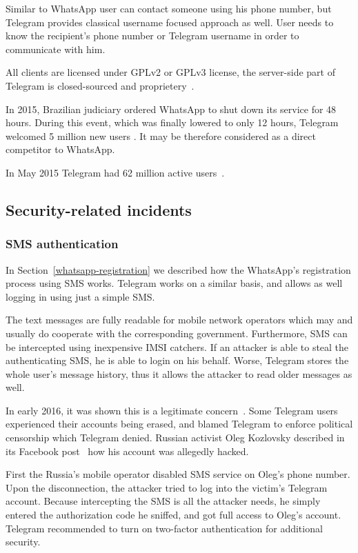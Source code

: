 \documentclass[thesis=M,english]{FITthesis}[2012/10/20]
\begin{document}
Similar to WhatsApp user can contact someone using his phone number, but Telegram provides classical username focused approach as well. User needs to know the recipient's phone number or Telegram username in order to communicate with him.

All clients are licensed under GPLv2 or GPLv3 license, the server-side part of Telegram is closed-sourced and proprietery~\cite{telegram-server}.

In 2015, Brazilian judiciary ordered WhatsApp to shut down its service for 48 hours. During this event, which was finally lowered to only 12 hours, Telegram welcomed 5 million new users \cite{whatsappbrazil}. It may be therefore considered as a direct competitor to WhatsApp.

In May 2015 Telegram had 62 million active users~\cite{telegram-users}.


\subsection{Security-related incidents}

\subsubsection{SMS authentication}

In Section~\ref{whatsapp-registration} we described how the WhatsApp's registration process using SMS works. Telegram works on a similar basis, and allows as well logging in using just a simple SMS.

The text messages are fully readable for mobile network operators which may and usually do cooperate with the corresponding government. Furthermore, SMS can be intercepted using inexpensive IMSI catchers. If an attacker is able to steal the authenticating SMS, he is able to login on his behalf. Worse, Telegram stores the whole user's message history, thus it allows the attacker to read older messages as well.

In early 2016, it was shown this is a legitimate concern~\cite{telegram-smsiran}. Some Telegram users experienced their accounts being erased, and blamed Telegram to enforce political censorship which Telegram denied. Russian activist Oleg Kozlovsky described in its Facebook post~\cite{telegram-russia} how his account was allegedly hacked.

First the Russia's mobile operator disabled SMS service on Oleg's phone number. Upon the disconnection, the attacker tried to log into the victim's Telegram account. Because intercepting the SMS is all the attacker needs, he simply entered the authorization code he sniffed, and got full access to Oleg's account. Telegram recommended to turn on two-factor authentication for additional security.
\end{document}
